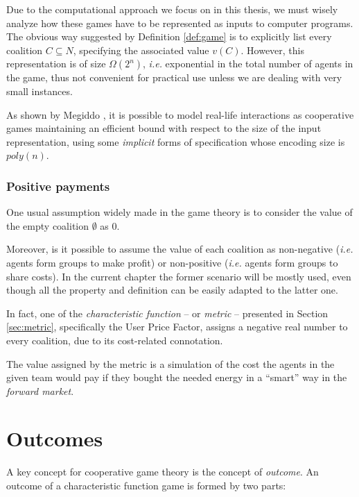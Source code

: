 \documentclass[11pt, twoside, titlepage, a4paper, openright]{report}
\begin{document}
Due to the computational approach we focus on in this thesis, we must wisely analyze how these games have to be represented as inputs to computer programs. The obvious way suggested by Definition \ref{def:game} is to explicitly list every coalition $C \subseteq N$, specifying the associated value $v(C)$. However, this representation is of size $\Omega(2^{n})$, \textit{i.e.} exponential in the total number of agents in the game, thus not convenient for practical use unless we are dealing with very small instances. 

\noindent As shown by Megiddo \cite{megiddo:78}, it is possible to model real-life interactions as cooperative games maintaining an efficient bound with respect to the size of the input representation, using some \textit{implicit} forms of specification whose encoding size is $poly(n)$.

\subsubsection{Positive payments}

One usual assumption widely made in the game theory is to consider the value of the empty coalition $\emptyset$ as 0. 

\noindent Moreover, is it possible to assume the value of each coalition as non-negative (\textit{i.e.} agents form groups to make profit) or non-positive (\textit{i.e.} agents form groups to share costs). In the current chapter the former scenario will be mostly used, even though all the property and definition can be easily adapted to the latter one.

\noindent In fact, one of the \textit{characteristic function} -- or \textit{metric} -- presented in Section \ref{sec:metric}, specifically the User Price Factor, assigns a negative real number to every coalition, due to its cost-related connotation. 

\noindent The value assigned by the metric is a simulation of the cost the agents in the given team would pay if they bought the needed energy in a ``smart'' way in the \textit{forward market}.

\section{Outcomes}

A key concept for cooperative game theory is the concept of \textit{outcome}.
An outcome of a characteristic function game is formed by two parts:
\end{document}
